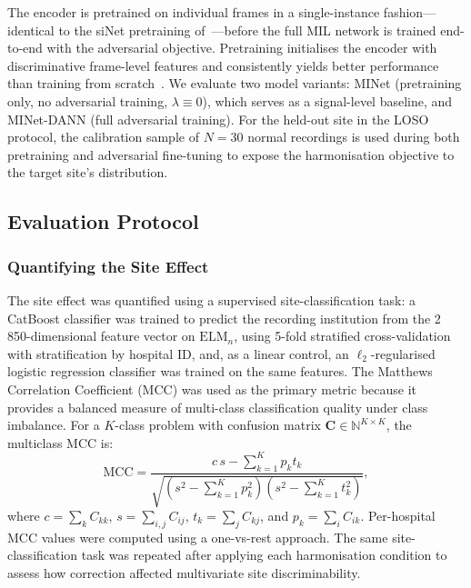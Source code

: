 \documentclass[preprint,12pt]{elsarticle}
\begin{document}
The encoder is pretrained on individual frames in a single-instance
fashion---identical to the siNet pretraining of~\cite{poziomska2026quantity}---before the full MIL network is trained
end-to-end with the adversarial objective.
Pretraining initialises the encoder with discriminative frame-level
features and consistently yields better performance than training
from scratch~\cite{poziomska2026quantity}.
We evaluate two model variants: MINet (pretraining only, no
adversarial training, $\lambda \equiv 0$), which serves as a
signal-level baseline, and MINet-DANN (full adversarial training).
For the held-out site in the LOSO protocol, the calibration sample
of $N = 30$ normal recordings is used during both pretraining and
adversarial fine-tuning to expose the harmonisation objective to
the target site's distribution.

\subsection{Evaluation Protocol}
\label{subsec:evaluation}

\subsubsection{Quantifying the Site Effect}
\label{subsubsec:site_quant}

The site effect was quantified using a supervised site-classification
task: a CatBoost classifier was trained to predict the recording
institution from the 2\,850-dimensional feature vector on
$\mathrm{ELM}_n$, using 5-fold stratified cross-validation with
stratification by hospital ID, and, as a linear control, an
$\ell_2$-regularised logistic regression classifier was trained on
the same features.
The Matthews Correlation Coefficient (MCC) was used as the primary
metric because it provides a balanced measure of multi-class
classification quality under class imbalance.
For a $K$-class problem with confusion matrix
$\mathbf{C} \in \mathbb{N}^{K \times K}$, the multiclass MCC is:
\begin{equation}
  \mathrm{MCC} = \frac{c\,s - \sum_{k=1}^{K} p_k t_k}
    {\sqrt{\!\left(s^2 - \sum_{k=1}^{K} p_k^2\right)
           \!\left(s^2 - \sum_{k=1}^{K} t_k^2\right)}},
  \label{eq:mcc}
\end{equation}
where $c = \sum_k C_{kk}$, $s = \sum_{i,j} C_{ij}$,
$t_k = \sum_j C_{kj}$, and $p_k = \sum_i C_{ik}$.
Per-hospital MCC values were computed using a one-vs-rest approach.
The same site-classification task was repeated after applying each
harmonisation condition to assess how correction affected multivariate
site discriminability.
\end{document}
